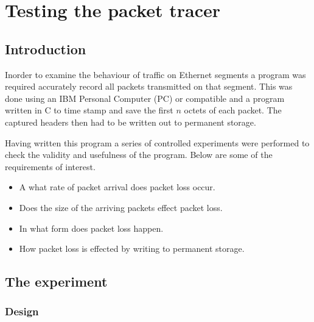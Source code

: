 



\chapter{Testing the packet tracer}

\section{Introduction}

Inorder to examine the behaviour of traffic on Ethernet segments a
program was required accurately record all packets transmitted on that
segment.  This was done using an IBM Personal Computer (PC) or
compatible and a program written in C to time stamp and save the first
$n$ octets of each packet.  The captured headers then had to be
written out to permanent storage.

Having written this program a series of controlled experiments were
performed to check the validity and usefulness of the program.  Below
are some of the requirements of interest.

\begin{itemize}
\item	A what rate of packet arrival does packet loss occur.

\item	Does the size of the arriving packets effect packet loss.

\item	In what form does packet loss happen.

\item	How packet loss is effected by writing to permanent storage.
\end{itemize}

\section{The experiment}

\subsection{Design}

